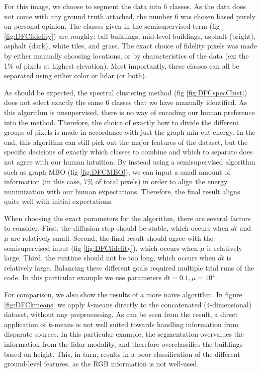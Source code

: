 \documentclass[journal]{IEEEtran}
\begin{document}
For this image, we choose to segment the data into 6 classes. As the data does
not come with any ground truth attached, the number 6 was chosen based purely on
personal opinion. The classes given in the semisupervised term (fig
\ref{fig:DFCfidelity}) are roughly: tall buildings, mid-level buildings, asphalt
(bright), asphalt (dark), white tiles, and grass. The exact choice of fidelity
pixels was made by either manually choosing locations, or by characteristics of
the data (ex: the 1\% of pixels at highest elevation). Most importantly, these
classes can all be separated using either color or lidar (or both).

As should be expected, the spectral clustering method (fig
\ref{fig:DFCspecClust}) does not select exactly the same 6 classes that we have manually
identified. As this algorithm is unsupervised, there is no way of encoding our
human preference into the method. Therefore, the choice of exactly how to divide
the different groups of pixels is made in accordance with just the graph min cut
energy. In the end, this algorithm can still pick out the major features of the
dataset, but the specific decisions of exactly which classes to combine and
which to separate does not agree with our human intuition. By instead using a
semisupervised algorithm such as graph MBO (fig \ref{fig:DFCMBO}), we can input
a small amount of information (in this case, 7\% of total pixels) in order to
align the energy minimization with our human expectations. Therefore, the final
result aligns quite well with initial expectations.

When choosing the exact parameters for the algorithm, there are several factors
to consider. First, the diffusion step should be stable, which occurs when $dt$
and $\mu$ are relatively small. Second, the final result should agree with the
semisupervised input (fig \ref{fig:DFCfidelity}), which occurs when $\mu$ is
relatively large. Third, the runtime should not be too long, which occurs when
$dt$ is relatively large. Balancing these different goals required multiple
trial runs of the code. In this particular example we use parameters
$dt = 0.1, \mu = 10^4$.

For comparison, we also show the results of a more naive algorithm.  In figure
\ref{fig:DFCkmeans} we apply $k$-means directly to the concatenated
(4-dimensional) dataset, without any preprocessing. As can be seen from the
result, a direct application of $k$-means is not well suited towards handling
information from disparate sources. In this particular example, the segmentation
overvalues the information from the lidar modality, and therefore overclassifies
the buildings based on height. This, in turn, results in a poor classification
of the different ground-level features, as the RGB information is not well-used.
\end{document}
